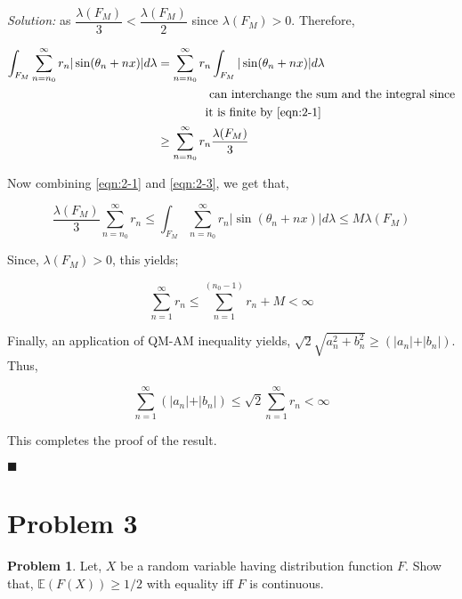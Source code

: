 \documentclass[12pt]{article}
\newcommand{\E}{\mathbb{E}}
\theoremstyle{definition}
\newtheorem*{prb}{Problem}
\newenvironment{problem}{
\begin{tcolorbox}[colback=blue!5!white,colframe=blue!75!black, parbox = true] \begin{prb}  }{\end{prb}\end{tcolorbox} }
\newenvironment{answer}{\textit{Solution: }\quad }{ \hfill $\blacksquare$}
\begin{document}
\begin{answer}
	as $\dfrac{\lambda(F_M)}{3} < \dfrac{\lambda(F_M)}{2}$ since $\lambda(F_M) > 0$. Therefore,

	\begin{equation}
		\begin{split}
			\int_{F_M} \sum_{n = n_0}^{\infty} r_n \vert \sin(\theta_n + nx) \vert d\lambda
			& = \sum_{n = n_0}^{\infty} r_n \int_{F_M} \vert \sin(\theta_n + nx) \vert d\lambda\\
			& \qquad \qquad \text{ can interchange the sum and the integral since}\\
			& \qquad \qquad \text{it is finite by \cref{eqn:2-1}}\\
			& \geq \sum_{n = n_0}^{\infty} r_n \dfrac{\lambda(F_M)}{3}
		\end{split}
		\label{eqn:2-3}
	\end{equation}

	Now combining \cref{eqn:2-1} and \cref{eqn:2-3}, we get that,

	$$\dfrac{\lambda(F_M)}{3} \sum_{n = n_0}^{\infty} r_n \leq \int_{F_M} \sum_{n = n_0}^{\infty} r_n \vert \sin(\theta_n + nx) \vert d\lambda \leq M \lambda(F_M)$$

	Since, $\lambda(F_M) > 0$, this yields;

	$$\sum_{n = 1}^{\infty} r_n \leq \sum_{n = 1}^{(n_0 -1)} r_n + M < \infty$$

	Finally, an application of QM-AM inequality yields, $\sqrt{2}\sqrt{a_n^2 + b_n^2} \geq (\vert a_n \vert + \vert b_n \vert)$. Thus,

	$$\sum_{n = 1}^{\infty} (\vert a_n \vert + \vert b_n \vert) \leq \sqrt{2}\sum_{n = 1}^{\infty} r_n < \infty$$
	
	This completes the proof of the result.

\end{answer}


\pagebreak
\section{Problem 3}
\begin{problem}
	Let, $X$ be a random variable having distribution function $F$. Show that, $\E(F(X))\geq 1/2$ with equality iff $F$ is continuous.
\end{problem}
\end{document}
